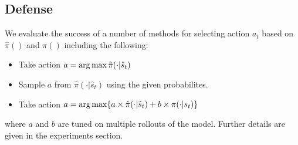 \subsection{Defense}
We evaluate the success of a number of methods for selecting action $a_t$
based on $\hat \pi()$ and $\pi()$ including the following:
\begin{itemize}
    \item Take action $a = \operatorname*{arg\,max} \hat \pi( \cdot \vert \hat s_t)$
    \item Sample $a$ from $\hat \pi( \cdot \vert \hat s_t)$ using the given probabilites.
    \item Take action $a =  \operatorname*{arg\,max} \{a \times \hat \pi( \cdot \vert \hat s_t) + b \times \pi( \cdot \vert s_t) \}$
\end{itemize}
where $a$ and $b$ are tuned on multiple rollouts of the model. Further details are given in the experiments section.

